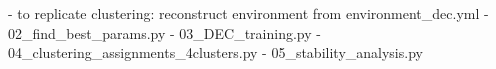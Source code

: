 - to replicate clustering: reconstruct environment from environment_dec.yml
	- 02_find_best_params.py
	- 03_DEC_training.py
	- 04_clustering_assignments_4clusters.py
	- 05_stability_analysis.py
	